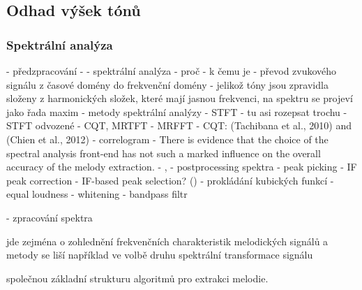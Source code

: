 \subsection{Odhad výšek tónů}

\subsubsection{Spektrální analýza}
- předzpracování
    - 
- spektrální analýza
    - proč - k čemu je
        - převod zvukového signálu z časové domény do frekvenční domény
        - jelikož tóny jsou zpravidla složeny z harmonických složek, které mají jasnou frekvenci, na spektru se projeví jako řada maxim
    - metody spektrální analýzy
        - STFT
            - tu asi rozepsat trochu
        - STFT odvozené - CQT, MRTFT
            - MRFFT \cite{Goto1999}
            - CQT: (Tachibana et al., 2010) and (Chien et al., 2012)
        - correlogram
        - There is evidence that the choice of the spectral analysis front-end has not such a marked influence on the overall accuracy of the melody extraction.
            - \cite{Dressler2016}, \cite{Salamon2014}
    - postprocessing spektra
        - peak picking  
            - IF peak correction
            - IF-based peak selection? (\cite{Goto1999})
            - prokládání kubických funkcí
        - equal loudness
        - whitening
        - bandpass filtr \cite{Goto1999}

- zpracování spektra



 jde zejména o zohlednění frekvenčních charakteristik melodických signálů a metody se liší například ve volbě druhu spektrální transformace signálu

 společnou základní strukturu algoritmů pro extrakci melodie.  